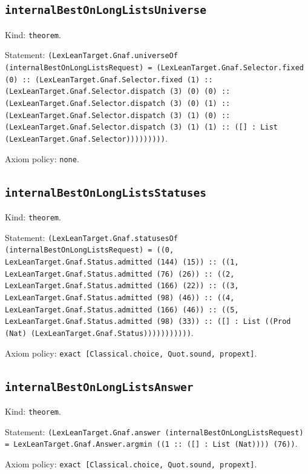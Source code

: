 \documentclass[11pt]{article}
\begin{document}
\subsection*{\texttt{internalBestOnLongListsUniverse}}
\noindent Kind: \texttt{theorem}.\par
\noindent Statement: \texttt{(LexLeanTarget.Gnaf.universeOf (internalBestOnLongListsRequest) = (LexLeanTarget.Gnaf.Selector.fixed (0) :: (LexLeanTarget.Gnaf.Selector.fixed (1) :: (LexLeanTarget.Gnaf.Selector.dispatch (3) (0) (0) :: (LexLeanTarget.Gnaf.Selector.dispatch (3) (0) (1) :: (LexLeanTarget.Gnaf.Selector.dispatch (3) (1) (0) :: (LexLeanTarget.Gnaf.Selector.dispatch (3) (1) (1) :: ([] : List (LexLeanTarget.Gnaf.Selector)))))))))}.\par
\noindent Axiom policy: \texttt{none}.\par
\subsection*{\texttt{internalBestOnLongListsStatuses}}
\noindent Kind: \texttt{theorem}.\par
\noindent Statement: \texttt{(LexLeanTarget.Gnaf.statusesOf (internalBestOnLongListsRequest) = ((0, LexLeanTarget.Gnaf.Status.admitted (144) (15)) :: ((1, LexLeanTarget.Gnaf.Status.admitted (76) (26)) :: ((2, LexLeanTarget.Gnaf.Status.admitted (166) (22)) :: ((3, LexLeanTarget.Gnaf.Status.admitted (98) (46)) :: ((4, LexLeanTarget.Gnaf.Status.admitted (166) (46)) :: ((5, LexLeanTarget.Gnaf.Status.admitted (98) (33)) :: ([] : List ((Prod (Nat) (LexLeanTarget.Gnaf.Status)))))))))))}.\par
\noindent Axiom policy: \texttt{exact [Classical.choice, Quot.sound, propext]}.\par
\subsection*{\texttt{internalBestOnLongListsAnswer}}
\noindent Kind: \texttt{theorem}.\par
\noindent Statement: \texttt{(LexLeanTarget.Gnaf.answer (internalBestOnLongListsRequest) = LexLeanTarget.Gnaf.Answer.argmin ((1 :: ([] : List (Nat)))) (76))}.\par
\noindent Axiom policy: \texttt{exact [Classical.choice, Quot.sound, propext]}.\par
\end{document}
